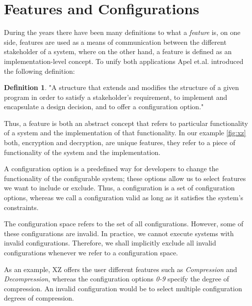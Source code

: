 \section{Features and Configurations}\label{feature-config}
\theoremstyle{definition}
\newtheorem{definition}{Definition}[section]

During the years there have been many definitions to what a \emph{feature} is, on one side, features are used as a means of communication between
the different stakeholder of a system, where on the other hand, a feature is defined as an implementation-level concept. 
To unify both applications Apel et.al. introduced the following definition:

\begin{definition}
    "A structure that extends and modifies the structure of a
    given program in order to satisfy a stakeholder's requirement, to implement and
    encapsulate a design decision, and to offer a configuration option."\cite{Feature-Oriented-Software-Product-Lines}     
\end{definition}

Thus, a feature is both an abstract concept that refers to particular functionality of a system and the implementation of that functionality.
In our example \autoref{fig:xz} both, encryption and decryption, are unique features, they refer to a piece of functionality of the system and the
implementation. 

A configuration option is a predefined way for developers to change the functionality of the configurable system; 
these options allow us to select features we want to include or exclude. Thus, a configuration is a set of configuration options, whereas 
we call a configuration valid as long as it satisfies the system's constraints.

The configuration space refers to the set of all configurations. However, some of these configurations are invalid. 
In practice, we cannot execute systems with invalid configurations. 
Therefore, we shall implicitly exclude all invalid configurations whenever we refer to a configuration space.

As an example, \textsc{XZ} offers the user different features such as \textit{Compression} and \textit{Decompression}, whereas 
the configuration options \textit{0-9} specify the degree of compression. An invalid configuration would be to select multiple 
configuration degrees of compression.
